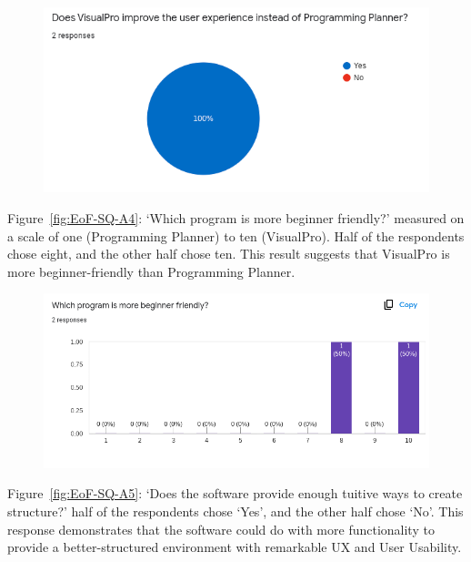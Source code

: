 \documentclass[12pt]{report} %
\begin{document}
			\begin{figure}[H]
				{\includegraphics[scale=0.50]{Figures/VisualPro-Survey_Results/SQ-A3.png}}
			\end{figure}

			Figure~\ref{fig:EoF-SQ-A4}: `Which program is more beginner friendly?' measured on a scale of one (Programming Planner) to ten (VisualPro). Half of the respondents chose eight, and the other half chose ten. This result suggests that VisualPro is more beginner-friendly than Programming Planner.

			\begin{figure}[H]
				{\includegraphics[scale=0.50]{Figures/VisualPro-Survey_Results/SQ-A4.png}}
			\end{figure}

			Figure~\ref{fig:EoF-SQ-A5}: `Does the software provide enough tuitive ways to create structure?' half of the respondents chose `Yes', and the other half chose `No'. This response demonstrates that the software could do with more functionality to provide a better-structured environment with remarkable UX and User Usability.
\end{document}
